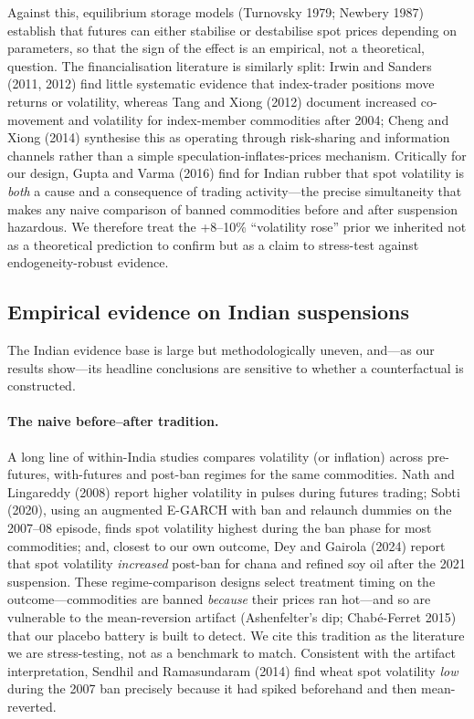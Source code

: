 Against this, equilibrium storage models (Turnovsky 1979; Newbery 1987) establish
that futures can either stabilise or destabilise spot prices depending on parameters,
so that the sign of the effect is an empirical, not a theoretical, question. The
financialisation literature is similarly split: Irwin and Sanders (2011, 2012) find
little systematic evidence that index-trader positions move returns or volatility,
whereas Tang and Xiong (2012) document increased co-movement and volatility for
index-member commodities after 2004; Cheng and Xiong (2014) synthesise this as
operating through risk-sharing and information channels rather than a simple
speculation-inflates-prices mechanism. Critically for our design, Gupta and Varma
(2016) find for Indian rubber that spot volatility is \emph{both} a cause and a
consequence of trading activity---the precise simultaneity that makes any naive
comparison of banned commodities before and after suspension hazardous. We therefore
treat the +8--10\% ``volatility rose'' prior we inherited not as a theoretical
prediction to confirm but as a claim to stress-test against endogeneity-robust
evidence.

\subsection{Empirical evidence on Indian suspensions}
\label{sec:background-empirics}

The Indian evidence base is large but methodologically uneven, and---as our results
show---its headline conclusions are sensitive to whether a counterfactual is
constructed.

\paragraph{The naive before--after tradition.} A long line of within-India studies
compares volatility (or inflation) across pre-futures, with-futures and post-ban
regimes for the same commodities. Nath and Lingareddy (2008) report higher volatility
in pulses during futures trading; Sobti (2020), using an augmented E-GARCH with ban
and relaunch dummies on the 2007--08 episode, finds spot volatility highest during the
ban phase for most commodities; and, closest to our own outcome, Dey and Gairola
(2024) report that spot volatility \emph{increased} post-ban for chana and refined soy
oil after the 2021 suspension. These regime-comparison designs select treatment timing
on the outcome---commodities are banned \emph{because} their prices ran hot---and so
are vulnerable to the mean-reversion artifact (Ashenfelter's dip; Chab\'{e}-Ferret
2015) that our placebo battery is built to detect. We cite this tradition as the
literature we are stress-testing, not as a benchmark to match. Consistent with the
artifact interpretation, Sendhil and Ramasundaram (2014) find wheat spot volatility
\emph{low} during the 2007 ban precisely because it had spiked beforehand and then
mean-reverted.

